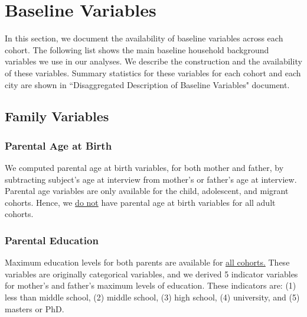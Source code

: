 \documentclass[12pt]{article}
\begin{document}
\begin{table}[H]
\centering
\caption{Nationality and Income of Caregivers of Migrant Children, Parma} \label{tab:Mincome-parma}
\end{table}

\begin{table}[H]
\centering
\caption{Nationality and Income of Caregivers of Migrant Children, Padova} \label{tab:Mincome-padova}
\end{table}

\section{Baseline Variables}
In this section, we document the availability of baseline variables across each cohort. The following list shows the main baseline household background variables we use in our analyses. We describe the construction and the availability of these variables. Summary statistics for these variables for each cohort and each city are shown in ``Disaggregated Description of Baseline Variables" document.

\subsection{Family Variables}

\subsubsection{Parental Age at Birth} 
We computed parental age at birth variables, for both mother and father, by subtracting subject's age at interview from mother's or father's age at interview. Parental age variables are only available for the child, adolescent, and migrant cohorts. Hence, we \underline{do not} have parental age at birth variables for all adult cohorts.

\subsubsection{Parental Education} 
Maximum education levels for both parents are available for \underline{all cohorts.} These variables are originally categorical variables, and we derived 5 indicator variables for mother's and father's maximum levels of education. These indicators are: (1) less than middle school, (2) middle school, (3) high school, (4) university, and (5) masters or PhD. 
\end{document}
